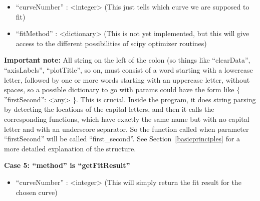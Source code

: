 \documentclass[11pt]{article} %
\begin{document}
\begin{tcolorbox}[breakable,title=Sending ``params'' to the server]
\begin{itemize}
\item ``curveNumber'' : <integer> (This just tells which curve we are supposed to fit)

\item ``fitMethod'' : <dictionary> (This is not yet implemented, but this will give access to the different possibilities of scipy optimizer routines)

\end{itemize}

\textbf{Important note:} All string on the left of the colon (so things like ``clearData'', ``axisLabels'', ``plotTitle'', so on, must consist of a word starting with a lowercase letter, followed by one or more words starting with an uppercase letter, without spaces, so a possible dictionary to go with params could have the form like { \{ {''}firstSecond{''}: <any> \}}. This is crucial. Inside the program, it does string parsing by detecting the locations of the capital letters, and then it calls the corresponding functions, which have exactly the same name but with no capital letter and with an underscore separator. So the function called when parameter ``firstSecond'' will be called ``first\_second''. See Section~\ref{basicprinciples} for a more detailed explanation of the structure.  

\textbf{Case 5: ``method'' is ``getFitResult''}

\begin{itemize}
\item ``curveNumber'' : <integer> (This will simply return the fit result for the chosen curve)
\end{itemize}

\end{tcolorbox}



 
\end{document}
